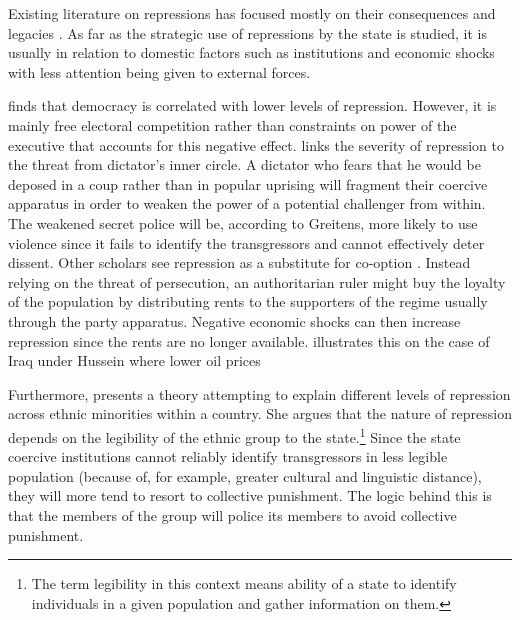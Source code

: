 Existing literature on repressions has focused mostly on their consequences and legacies \citep{rozenas_political_2017, lupu_legacy_2017, zhukov_stalins_2018}. As far as the strategic use of repressions by the state is studied, it is usually in relation to domestic factors such as institutions and economic shocks \citep{davenport_state_2007, greitens_dictators_2016, blaydes_state_2018} with less attention being given to external forces. 

\citet{davenport_state_2007} finds that democracy is correlated with lower levels of repression. However, it is mainly free electoral competition rather than constraints on power of the executive that accounts for this negative effect.  
\citet{greitens_dictators_2016} links the severity of repression to the threat from dictator's inner circle. A dictator who fears that he would be deposed in a coup rather than in popular uprising will fragment their coercive apparatus in order to weaken the power of a potential challenger from within. The weakened secret police will be, according to Greitens, more likely to use violence since it fails to identify the transgressors and cannot effectively deter dissent. 
Other scholars see repression as a substitute for co-option \citep{wintrobe_political_1998, svolik_politics_2012}. Instead relying on the threat of persecution, an authoritarian ruler might buy the loyalty of the population by distributing rents to the supporters of the regime usually through the party apparatus. Negative economic shocks can then increase repression since the rents are no longer available.  \citet{blaydes_state_2018} 
illustrates this on the case of Iraq under Hussein where lower oil prices 

Furthermore, \citet{blaydes_state_2018} presents a theory attempting to explain different levels of repression across ethnic minorities within a country. She argues that the nature of repression  depends on the legibility of the ethnic group to the state.\footnote{The term legibility in this context means ability of a state to identify individuals in a given population and gather information on them.}
 Since the state coercive institutions cannot reliably identify transgressors in  less legible population (because of, for example, greater cultural and linguistic distance), they will more tend to resort to collective punishment. The logic behind this is that the members of the group will police its members to avoid collective punishment. 

